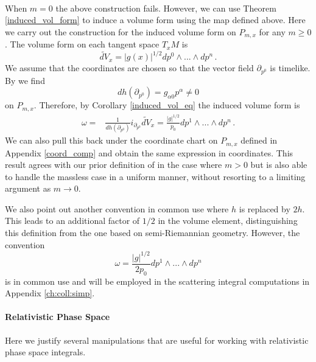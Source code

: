 \\
When $m=0$ the above construction fails.  However, we can use Theorem \ref{induced_vol_form} to induce a volume form using the map  defined above. Here we carry out the construction for the induced volume form on $P_{m,x}$ for any $m\geq 0$. The volume form on each tangent space $T_xM$ is
\begin{equation}
\tilde{dV}_x=|g(x)|^{1/2}dp^0\wedge...\wedge dp^n\,.
\end{equation}
We assume that the coordinates are chosen so that the vector field $\partial_{p^0}$ is timelike. By  we find
\begin{equation}
dh(\partial_{p^0})=g_{\alpha 0}p^\alpha\neq 0
\end{equation}
on $P_{m,x}$.  Therefore, by Corollary \ref{induced_vol_eq} the induced volume form is
\begin{align}\label{mass_shell_vol}
\omega=&\frac{1}{dh(\partial_{p^0})} i_{\partial_{p^0}} \tilde{dV}_x
=\frac{|g|^{1/2}}{p_0}dp^1\wedge...\wedge dp^n\,.
\end{align}
We can also pull this back under the coordinate chart on $P_{m,x}$ defined in Appendix \ref{coord_comp} and obtain the same expression in coordinates. This result agrees with our prior definition of  in the case where $m>0$ but is also able to handle the massless case in a uniform manner, without resorting to a limiting argument as $m\rightarrow 0$.

We also point out another convention in common use where $h$ is replaced by $2h$.  This leads to an additional factor of $1/2$ in the volume element, distinguishing this definition from the one based on semi-Riemannian geometry.  However, the convention
\begin{equation}
\omega=\frac{|g|^{1/2}}{2p_0}dp^1\wedge...\wedge dp^n
\end{equation}
 is in common use and will be employed in the scattering integral computations in Appendix \ref{ch:coll:simp}.

\paragraph{Relativistic Phase Space}
Here we justify several manipulations that are useful for working with relativistic phase space integrals.

